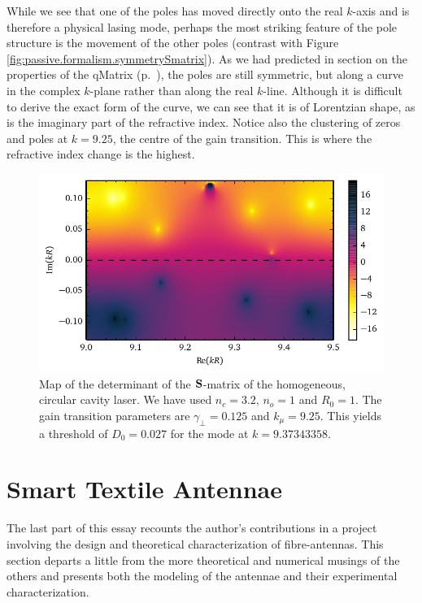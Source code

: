 While we see that one of the poles has moved directly 
onto the real $k$-axis and is therefore a physical lasing
mode, perhaps the most striking feature of the pole structure
is the movement of the other poles (contrast with Figure \ref{fig:passive.formalism.symmetrySmatrix}). 
As we had predicted in section on the properties of the \gls{qMatrix} (p.~\pageref{sec:passive.formalism.SpoleStructure}), 
the poles are still symmetric, but along a curve in the complex 
$k$-plane rather than along the real $k$-line. Although it is difficult to derive the exact
form of the curve, we can see that it is of Lorentzian shape, 
as is the imaginary part of the refractive index. Notice also
the clustering of zeros and poles at $k=9.25$, the centre of the
gain transition. This is where the refractive index change is the highest.

\begin{figure}
	\centering
	\includegraphics{figs/active/determinantSmatrixSALT.pdf}
	\caption[Map of the determinant of the $\mat{S}$-matrix of the
			amplified system]
			{Map of the determinant of the $\mat{S}$-matrix of the 
			homogeneous, circular cavity laser. We have used $n_c=3.2$, $n_o=1$ and
			$R_0=1$. The gain transition parameters are $\gamma_\perp=0.125$ and $k_\mu=9.25$. 
			This yields a threshold of $D_0=0.027$ for the mode at $k=9.37343358$.}
	\label{fig:active.salt.detSmat}
\end{figure}

\section{Smart Textile Antennae}
The last part of this essay recounts the author's contributions
in a project involving the design and theoretical characterization
of fibre-antennas. This section departs a little from the more theoretical
and numerical musings of the others and presents both the modeling of the 
antennae and their experimental characterization.   

